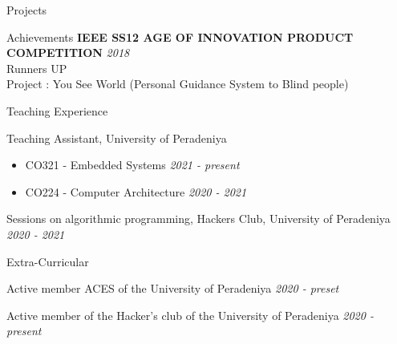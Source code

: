 \documentclass{resume} %
\begin{document}
\begin{rSection}{Projects}
\begin{rSection}{Achievements}
{\bf IEEE SS12 AGE OF INNOVATION PRODUCT COMPETITION} \hfill {\em 2018}
\\Runners UP
\\Project : You See World (Personal Guidance System to Blind people)

\end{rSection}



\end{rSection}

\begin{rSection}{Teaching Experience} \itemsep -3pt
\item Teaching Assistant, University of Peradeniya 
\begin{itemize}
    \item CO321 - Embedded Systems \hfill {\em 2021 - present} 
    \item CO224 - Computer Architecture \hfill {\em 2020 - 2021} 
\end{itemize}
\item Sessions on algorithmic programming, Hackers Club, University of Peradeniya \hfill {\em 2020 - 2021} 

 
\end{rSection}

\begin{rSection}{Extra-Curricular} \itemsep -3pt
\item Active member ACES of the University of Peradeniya \hfill {\em 2020 - preset} 
\item Active member of the Hacker's club of the University of Peradeniya \hfill {\em 2020 - present} 

 
\end{rSection}


\end{document}
